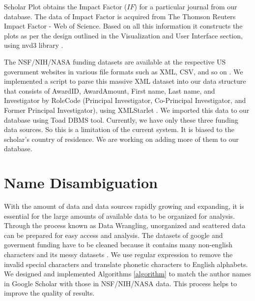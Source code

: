 
Scholar Plot obtains the Impact Factor ($IF$) for a particular journal from our database. The data of Impact Factor is acquired from The Thomson Reuters Impact Factor - Web of Science. Based on all this information it constructs the plots as per the design outlined in the Visualization and User Interface section, using nvd3 library \cite{nvd3org}.

The NSF/NIH/NASA funding datasets are available at the respective US government websites in various file formats such as XML, CSV, and so on \cite{nsf, nih, nasa}. We implemented a script to parse this massive XML dataset into our data structure that consists of AwardID, AwardAmount, First name, Last name, and Investigator by RoleCode (Principal Investigator, Co-Principal Investigator, and Former Principal Investigator), using XMLStarlet \cite{XMLStarlet}. We imported this data to our database using Toad DBMS tool. Currently, we have only these three funding data sources. So this is a limitation of the current system. It is biased to the scholar's country of residence. We are working on adding more of them to our database. %




\section{Name Disambiguation}


With the amount of data and data sources rapidly growing and expanding, it is essential for the large amounts of available data to be organized for analysis. Through the process known as Data Wrangling, unorganized and scattered data can be prepared for easy access and analysis. The datasets of google and goverment funding have to be cleaned because it contains many non-english characters and its messy datasets \cite{kang2008interactive}. We use regular expression to remove the invalid special characters and translate phonetic characters to English alphabets. We designed and implemented Algorithms \ref{algorithm} to match the author names in Google Scholar with those in NSF/NIH/NASA data. This process helps to improve the quality of results.


